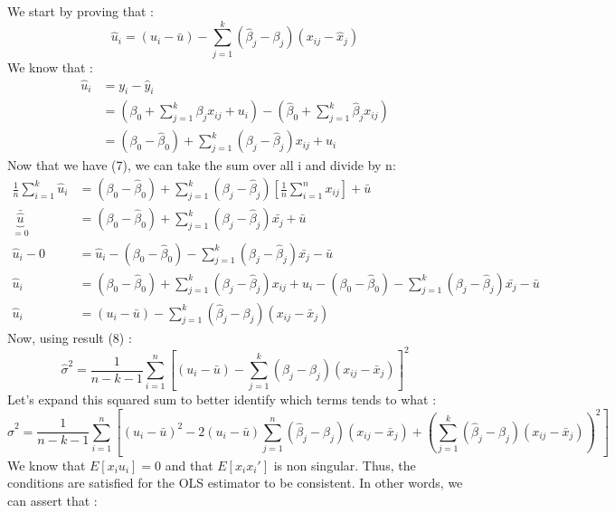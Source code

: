 \documentclass{article}
\begin{document}
We start by proving that : 
\begin{equation}
    \hat{u}_i=(u_i-\bar{u})-\sum_{j=1}^k(\hat{\beta}_j -\beta_j)(x_{ij}-\hat{x}_j)
\end{equation}
We know that : 
\begin{equation}
\begin{aligned}
    \hat{u}_i&=y_i-\hat{y}_i\\
    &= (\beta_0+\sum_{j=1}^k\beta_jx_{ij}+u_i) - (\hat{\beta}_0+\sum_{j=1}^k\hat{\beta}_jx_{ij})\\
    &=(\beta_0 - \hat{\beta}_0)+\sum_{j=1}^k(\beta_j-\hat{\beta}_j)x_{ij} + u_i
\end{aligned}
\end{equation}
Now that we have (7), we can take the sum over all i and divide by n:
\begin{equation}
\begin{aligned}
    \frac{1}{n}\sum_{i=1}^k\hat{u}_i &= (\beta_0-\hat{\beta}_0) + \sum_{j=1}^k(\beta_j-\hat{\beta}_j) [\frac{1}{n}\sum_{i=1}^nx_{ij}] + \bar{u} \\
    \underbrace{\bar{\hat{u}}}_{=0} &= (\beta_0-\hat{\beta}_0) + \sum_{j=1}^k(\beta_j-\hat{\beta}_j)\bar{x_j}+ \bar{u} \\
        \hat{u}_i-0&= \hat{u}_i - (\beta_0-\hat{\beta}_0) - \sum_{j=1}^k(\beta_j-\hat{\beta}_j)\bar{x_j}- \bar{u} \\
        \hat{u}_i &= (\beta_0 - \hat{\beta}_0)+\sum_{j=1}^k(\beta_j-\hat{\beta}_j)x_{ij} + u_i- (\beta_0-\hat{\beta}_0) - \sum_{j=1}^k(\beta_j-\hat{\beta}_j)\bar{x_j}- \bar{u}\\
        \hat{u}_i &= (u_i-\bar{u}) - \sum_{j=1}^k(\hat{\beta}_j-\beta_j)(x_{ij}-\bar{x}_j)
\end{aligned}
\end{equation}
Now, using result (8) : 
\begin{equation}
    \hat{\sigma}^2=\frac{1}{n-k-1}\sum_{i=1}^n[(u_i-\bar{u}) - \sum_{j=1}^k(\hat{\beta}_j-\beta_j)(x_{ij}-\bar{x}_j)]^2
\end{equation}
Let's expand this squared sum to better identify which terms tends to what : 
\begin{equation}
     \hat{\sigma}^2 = \frac{1}{n - k - 1}   \sum_{i=1}^n \left[(u_i - \bar{u})^2    - 2 (u_i-\bar{u})\sum_{j=1}^n(\hat{\beta}_j - \beta_j)(x_{ij} - \bar{x}_j)   + \left( \sum_{j=1}^k (\hat{\beta}_j - \beta_j)(x_{ij} - \bar{x}_j) \right)^2\right]  
\end{equation}
We know that $E[x_iu_i]=0$ and that $E[x_ix_i']$ is non singular. Thus, the conditions are satisfied for the OLS estimator to be consistent. In other words, we can assert that : 
\end{document}
